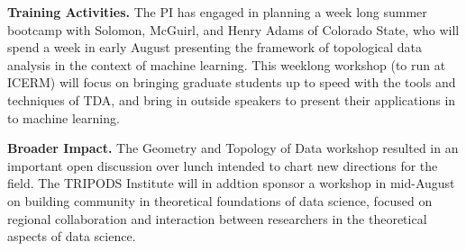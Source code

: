 {\bf Training Activities.}
The PI has engaged in planning a week long summer bootcamp with Solomon, McGuirl, and Henry Adams of Colorado State, who will spend a week in early August presenting the framework of topological data analysis in the context of machine learning. This weeklong workshop (to run at ICERM) will focus on bringing graduate students up to speed with the tools and techniques of TDA, and bring in outside speakers to present their applications in to machine learning.

{\bf Broader Impact.} The Geometry and Topology of Data workshop resulted in an important open discussion over lunch intended to chart new directions for the field. The TRIPODS Institute will in addtion sponsor a workshop in mid-August on building community in theoretical foundations of data science, focused on regional collaboration and interaction between researchers in the theoretical aspects of data science.
